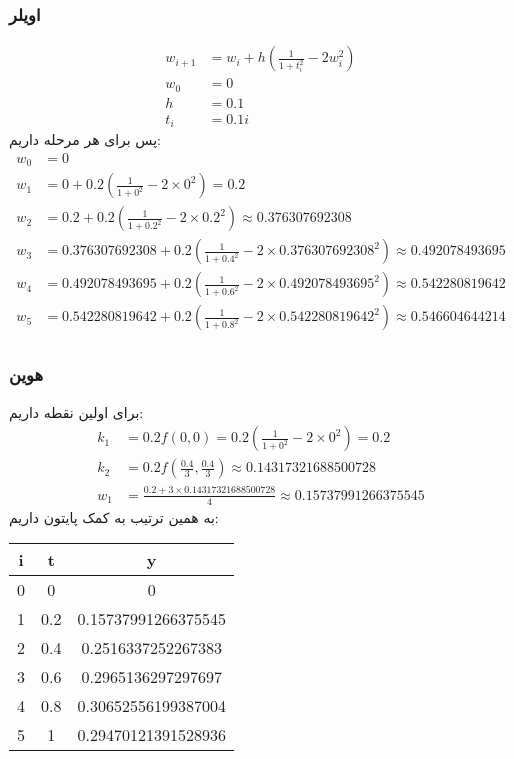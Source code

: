 \documentclass[]{article}
\begin{document}
\subsubsection*{اویلر}
\begin{align*}
    w_{i+1} &= w_i + h\left(\frac{1}{1+t_i^2}-2w_i^2\right)\\
    w_0 &= 0\\
    h &= 0.1\\
    t_i &= 0.1i
\end{align*}
پس برای هر مرحله داریم:
\begin{align*}
    w_0 &= 0\\
    w_1 &= 0 + 0.2\left(\frac{1}{1+0^2}-2 \times 0^2\right) = 0.2\\
    w_2 &= 0.2 + 0.2\left(\frac{1}{1+0.2^2}-2\times 0.2^2\right) \approx 0.376307692308\\
    w_3 &= 0.376307692308 + 0.2\left(\frac{1}{1+0.4^2}-2\times0.376307692308^2\right) \approx 0.492078493695\\
    w_4 &= 0.492078493695 + 0.2\left(\frac{1}{1+0.6^2}-2\times0.492078493695^2\right) \approx 0.542280819642\\
    w_5 &= 0.542280819642 + 0.2\left(\frac{1}{1+0.8^2}-2\times0.542280819642^2\right) \approx 0.546604644214\\
\end{align*}
\subsubsection*{هوین}
برای اولین نقطه داریم:
\begin{align*}
    k_1 &= 0.2 f(0, 0) = 0.2\left(\frac{1}{1+0^2}-2 \times 0^2\right) = 0.2\\
    k_2 &= 0.2 f(\frac{0.4}{3}, \frac{0.4}{3}) \approx 0.14317321688500728\\
    w_1 &= \frac{0.2 + 3 \times 0.14317321688500728}{4} \approx 0.15737991266375545
\end{align*}
به همین ترتیب به کمک پایتون داریم:
\begin{latin}
    \centering
    \begin{tabular}{c|c|c}
        i & t & y\\
        \hline
        0 & 0 & 0\\
        1 & 0.2 & 0.15737991266375545\\
        2 & 0.4 & 0.2516337252267383\\
        3 & 0.6 & 0.2965136297297697\\
        4 & 0.8 & 0.30652556199387004\\
        5 & 1 & 0.29470121391528936\\
    \end{tabular}
\end{latin}
\end{document}
